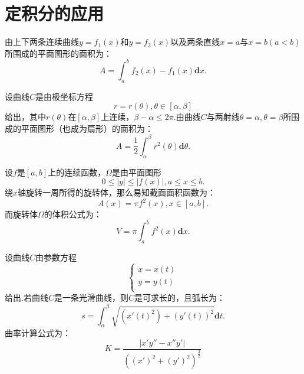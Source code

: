 \section{定积分的应用}

\begin{proposition}[平面图形的面积]
	由上下两条连续曲线$y=f_1(x)$和$y = f_2(x)$以及两条直线$x=a$与$x=b(a<b)$所围成的平面图形的面积为：
	\begin{equation}
		A = \int_{a}^{b}f_2(x)-f_1(x)\textbf{d}x.
	\end{equation}
\end{proposition}


\begin{proposition}[极坐标下的面积]
	设曲线$C$是由极坐标方程
	\begin{equation}
		r = r(\theta),\theta\in[\alpha,\beta]
	\end{equation}
	给出，其中$r(\theta)$在$[\alpha,\beta]$上连续，$\beta-\alpha\leq 2\pi$.由曲线$C$与两射线$\theta=\alpha,\theta=\beta$所围成的平面图形（也成为扇形）的面积为：
	\begin{equation}
		A = \dfrac{1}{2}\int_{\alpha}^{\beta}r^2(\theta)\textbf{d}\theta.
	\end{equation}
\end{proposition}


\begin{proposition}[旋转体的截面积与体积]
	设$f$是$[a,b]$上的连续函数，$\Omega$是由平面图形
	\begin{equation}
		0\leq |y|\leq |f(x)|,a\leq x\leq b.
	\end{equation}
	绕$x$轴旋转一周所得的旋转体，那么易知截面面积函数为：
	\begin{equation}
		A(x)=\pi f^2(x),x\in[a,b].
	\end{equation}
	而旋转体$\Omega$的体积公式为：
	\begin{equation}
		V = \pi \int_{a}^{b}f^2(x)\textbf{d}x.
	\end{equation}
\end{proposition}


\begin{proposition}[弧长与曲率]
	设曲线$C$由参数方程
	\begin{equation}
		\left\{
		\begin{aligned}
			x = x(t) \\
			y = y(t) \\
		\end{aligned}
		\right
		.
	\end{equation}
	给出.若曲线$C$是一条光滑曲线，则$C$是可求长的，且弧长为：
	\begin{equation}
		s = \int_{\alpha}^{\beta}\sqrt{(x'(t)^2)+(y'(t))^2}\textbf{d}t.
	\end{equation}
	曲率计算公式为：
	\begin{equation}
		K = \dfrac{|x'y''-x''y'|}{\left( (x')^2+(y')^2  \right)^{\frac{3}{2}}}
	\end{equation}
\end{proposition}


